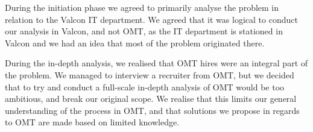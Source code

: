 During the initiation phase we agreed to primarily analyse the problem in relation to the Valcon IT department. We agreed that it was logical to conduct our analysis in Valcon, and not OMT, as the IT department is stationed in Valcon and we had an idea that most of the problem originated there.

During the in-depth analysis, we realised that OMT hires were an integral part of the problem. We managed to interview a recruiter from OMT, but we decided that to try and conduct a full-scale in-depth analysis of OMT would be too ambitious, and break our original scope. 
We realise that this limits our general understanding of the process in OMT, and that solutions we propose in regards to OMT are made based on limited knowledge.